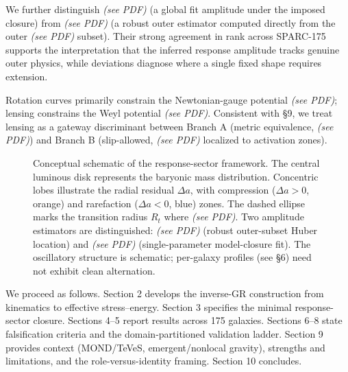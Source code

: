 We further distinguish \emph{(see PDF)} (a global fit amplitude under the imposed closure) from \emph{(see PDF)} (a robust outer estimator computed directly from the outer \emph{(see PDF)} subset). Their strong agreement in rank across SPARC-175 supports the interpretation that the inferred response amplitude tracks genuine outer physics, while deviations diagnose where a single fixed shape requires extension.

Rotation curves primarily constrain the Newtonian-gauge potential \emph{(see PDF)}; lensing constrains the Weyl potential \emph{(see PDF)}. Consistent with \S9, we treat lensing as a gateway discriminant between Branch A (metric equivalence, \emph{(see PDF)}) and Branch B (slip-allowed, \emph{(see PDF)} localized to activation zones).

\begin{figure}[t]
	\centering
	\caption{Conceptual schematic of the response-sector framework. The central luminous disk represents the baryonic mass distribution. Concentric lobes illustrate the radial residual $\Delta a$, with compression ($\Delta a > 0$, orange) and rarefaction ($\Delta a < 0$, blue) zones. The dashed ellipse marks the transition radius $R_t$ where \emph{(see PDF)}. Two amplitude estimators are distinguished: \emph{(see PDF)} (robust outer-subset Huber location) and \emph{(see PDF)} (single-parameter model-closure fit). The oscillatory structure is schematic; per-galaxy profiles (see \S6) need not exhibit clean alternation.}
	\label{fig:concept_schematic}
\end{figure}

We proceed as follows. Section 2 develops the inverse-GR construction from kinematics to effective stress--energy. Section 3 specifies the minimal response-sector closure. Sections 4--5 report results across 175 galaxies. Sections 6--8 state falsification criteria and the domain-partitioned validation ladder. Section 9 provides context (MOND/TeVeS, emergent/nonlocal gravity), strengths and limitations, and the role-versus-identity framing. Section 10 concludes.
